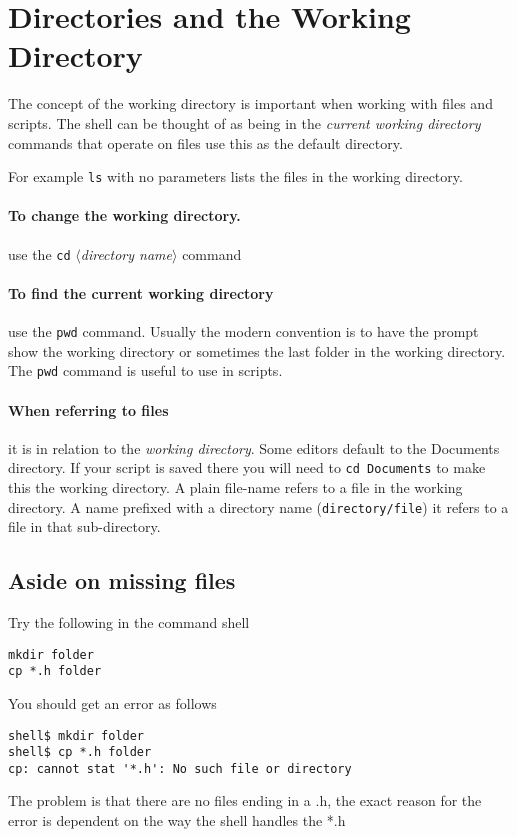 \documentclass[a4paper]{article}
\begin{document}
\section{Directories and the Working Directory}
The concept of the working directory is important when working with
files and scripts.  The shell can be thought of as being in the
\emph{current working directory} commands that operate on files use
this as the default directory.

For example \texttt{ls} with no parameters lists the files in the
working directory.

\paragraph{To change the working directory.}  use the \texttt{cd}
$\langle$\emph{directory name}$\rangle$ command

\paragraph{To find the current working directory} use the
\texttt{pwd} command.  Usually the modern convention is to have the
prompt show the working directory
or sometimes the last
  folder in the working directory.  The \texttt{pwd} command is
useful to use in scripts.

\paragraph{When referring to files} it is in relation to the
 \emph{working directory}.  Some editors default to the
  \textsf{Documents} directory.  If your script is saved there you
  will need to \texttt{cd Documents} to make this the working
  directory.
A plain file-name refers to a file in the working directory.  A name
prefixed with a directory name (\texttt{directory/file}) it refers to
a file in that sub-directory.

\subsection{Aside on missing files}
Try the following in the command shell
\begin{terminal}
\begin{verbatim}
mkdir folder
cp *.h folder
\end{verbatim}
\end{terminal}
You should get an error as follows
\begin{terminal}
\begin{verbatim}
shell$ mkdir folder
shell$ cp *.h folder
cp: cannot stat '*.h': No such file or directory
\end{verbatim}
\end{terminal}
The problem is that there are no files ending in a \textsf{.h}, the
exact reason for the error is dependent on the way the shell handles
the \textsf{*.h}
\end{document}
